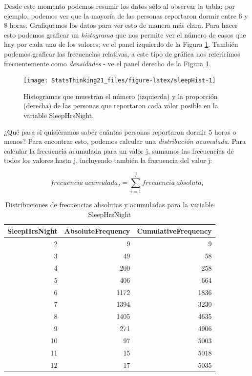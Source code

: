 \documentclass[
  12pt,
]{book}
\begin{document}
Desde este momento podemos resumir los datos sólo al observar la tabla; por ejemplo, podemos ver que la mayoría de las personas reportaron dormir entre 6 y 8 horas. Grafiquemos los datos para ver esto de manera más clara. Para hacer esto podemos graficar un \emph{histograma} que nos permite ver el número de casos que hay por cada uno de los valores; ve el panel izquierdo de la Figura \ref{fig:sleepHist}. También podemos graficar las frecuencias relativas, a este tipo de gráfica nos referirimos frecuentemente como \emph{densidades} - ve el panel derecho de la Figura \ref{fig:sleepHist}.

\begin{figure}
\texttt{[image: StatsThinking21\_files/figure-latex/sleepHist-1]} \caption{Histogramas que muestran el número (izquierda) y la proporción (derecha) de las personas que reportaron cada valor posible en la variable SleepHrsNight.}\label{fig:sleepHist}
\end{figure}

¿Qué pasa si quisiéramos saber cuántas personas reportaron dormir 5 horas o menos? Para encontrar esto, podemos calcular una \emph{distribución acumulada}. Para calcular la frecuencia acumulada para un valor j, sumamos las frecuencias de todos los valores hasta j, incluyendo también la frecuencia del valor j:

\[
frecuencia\ acumulada_j = \sum_{i=1}^{j}{frecuencia\ absoluta_i}
\]

\newpage

\begin{table}

\caption{\label{tab:unnamed-chunk-7}Distribuciones de frecuencias absolutas y acumuladas para la variable SleepHrsNight}
\centering
\begin{tabular}[t]{r|r|r}
\hline
SleepHrsNight & AbsoluteFrequency & CumulativeFrequency\\
\hline
2 & 9 & 9\\
\hline
3 & 49 & 58\\
\hline
4 & 200 & 258\\
\hline
5 & 406 & 664\\
\hline
6 & 1172 & 1836\\
\hline
7 & 1394 & 3230\\
\hline
8 & 1405 & 4635\\
\hline
9 & 271 & 4906\\
\hline
10 & 97 & 5003\\
\hline
11 & 15 & 5018\\
\hline
12 & 17 & 5035\\
\hline
\end{tabular}
\end{table}
\end{document}
